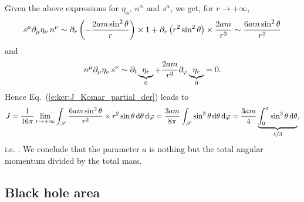 Given the above expressions for $\eta_\alpha$, $n^\alpha$ and $s^\alpha$,
we get, for $r\rightarrow+\infty$,
\[
  s^\mu \partial_\mu \eta_\nu \, n^\nu \sim \partial_r \left( - \frac{2 a m \sin^2\theta}{r} \right) \times 1 + \partial_r \left(r^2 \sin^2\theta \right) \times \frac{2 a m}{r^3}
    \sim \frac{6 a m \sin^2\theta}{r^2}
\]
and
\[
    n^\mu \partial_\mu \eta_\nu \, s^\nu \sim \partial_t \underbrace{\eta_r}_{0}
        + \frac{2 a m}{r^3} \partial_\varphi \underbrace{\eta_r}_{0}  = 0 .
\]
Hence Eq.~(\ref{e:ker:J_Komar_partial_der}) leads to
\[
    J = \frac{1}{16\pi} \lim_{r\rightarrow +\infty}
        \int_{\mathscr{S}}
        \frac{6 a m \sin^2\theta}{r^2} \times
        r^2\sin\theta \, \mathrm{d}\theta\, \mathrm{d}\varphi  =
        \frac{3 a m}{8\pi} \int_{\mathscr{S}} \sin^3\theta \, \mathrm{d}\theta\, \mathrm{d}\varphi
        = \frac{3 a m}{4} \underbrace{\int_0^\pi \sin^3\theta \, \mathrm{d}\theta}_{4/3} ,
\]
i.e.
\be
     .
\ee
We conclude that the parameter $a$ is nothing but the total angular momentum
divided by the total mass.

\subsection{Black hole area}

